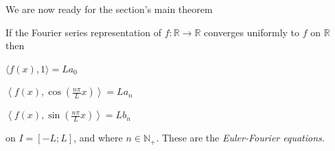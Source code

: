 We are now ready for the section's main theorem
\begin{theorem}
	If the Fourier series representation of $f:\mathbb{R} \rightarrow \mathbb{R}$ 
	converges uniformly to $f$ on $\mathbb{R}$ then 
	\begin{description}[style=unboxed,leftmargin=0.5cm]
		\item[1] $\langle f(x), 1 \rangle = La_0$
		\item[2] $\left \langle f(x), \cos\left(\frac{n \pi}{L}x\right)
			\right\rangle = L a_n$
		\item[3] $\left \langle f(x), \sin\left(\frac{n \pi}{L}x\right)
			\right\rangle = L b_n$
	\end{description}	
	on $I=[-L; L]$, and where $n\in\mathbb{N}_+$. These are the \emph{Euler-Fourier
	equations.}   
\end{theorem}

